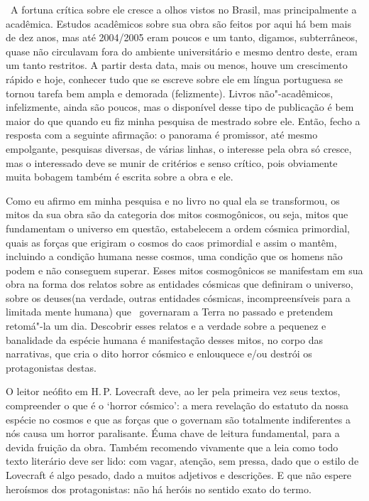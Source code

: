 \begin{changemargin}
 A fortuna crítica sobre ele cresce a olhos vistos no Brasil, mas principalmente a acadêmica. Estudos acadêmicos sobre sua obra são feitos por aqui há bem mais de dez anos, mas até 2004/2005 eram poucos e um tanto, digamos, subterrâneos, quase não circulavam fora do ambiente universitário e mesmo dentro deste, eram um tanto restritos. A partir desta data, mais ou menos, houve um crescimento rápido e hoje, conhecer tudo que se escreve sobre ele em língua portuguesa se tornou tarefa bem ampla e demorada (felizmente). Livros não"-acadêmicos, infelizmente, ainda são poucos, mas o {} disponível desse tipo de publicação é bem maior do que quando eu fiz minha pesquisa de mestrado sobre ele. Então, fecho a resposta com a seguinte afirmação: o panorama é promissor, até mesmo empolgante, pesquisas diversas, de várias linhas, o interesse pela obra só cresce, mas o interessado deve se munir de critérios e senso crítico, pois obviamente muita bobagem também é escrita sobre a obra e ele.

\bigskip


Como eu afirmo em minha pesquisa e no livro no qual ela se transformou, os mitos da sua obra são da categoria dos mitos cosmogônicos, ou seja, mitos que fundamentam o universo em questão, estabelecem a ordem cósmica primordial, quais as forças que erigiram o cosmos do caos primordial e assim o mantêm, incluindo a condição humana nesse cosmos, uma condição que os homens não podem e não conseguem superar. Esses mitos cosmogônicos se manifestam em sua obra na forma dos relatos sobre as entidades cósmicas que definiram o universo, sobre os deuses(na verdade, outras entidades cósmicas, incompreensíveis para a limitada mente humana) que  governaram a Terra no passado e pretendem retomá"-la um dia. Descobrir esses relatos e a verdade sobre a pequenez e banalidade da espécie humana é manifestação desses mitos, no corpo das narrativas, que cria o dito horror cósmico e enlouquece e/ou destrói os protagonistas destas.

\bigskip


O leitor neófito em H.\,P. Lovecraft deve, ao ler pela primeira vez seus textos, compreender o que é o `horror cósmico': a mera revelação do estatuto da nossa espécie no cosmos e que as forças que o governam são totalmente indiferentes a nós causa um horror paralisante. Éuma chave de leitura fundamental, para a devida fruição da obra. Também recomendo vivamente que a leia como todo texto literário deve ser lido: com vagar, atenção, sem pressa, dado que o estilo de Lovecraft é algo pesado, dado a muitos adjetivos e descrições. E que não espere heroísmos dos protagonistas: não há heróis no sentido exato do termo.


\end{changemargin}
